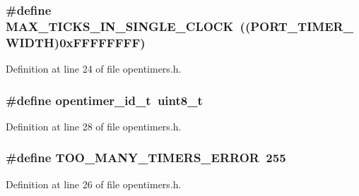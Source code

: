 \subsubsection[{\texorpdfstring{M\+A\+X\+\_\+\+T\+I\+C\+K\+S\+\_\+\+I\+N\+\_\+\+S\+I\+N\+G\+L\+E\+\_\+\+C\+L\+O\+CK}{MAX_TICKS_IN_SINGLE_CLOCK}}]{\setlength{\rightskip}{0pt plus 5cm}\#define M\+A\+X\+\_\+\+T\+I\+C\+K\+S\+\_\+\+I\+N\+\_\+\+S\+I\+N\+G\+L\+E\+\_\+\+C\+L\+O\+CK~(({\bf P\+O\+R\+T\+\_\+\+T\+I\+M\+E\+R\+\_\+\+W\+I\+D\+TH})0x\+F\+F\+F\+F\+F\+F\+F\+F)}\hypertarget{group___open_timers_ga9561941a53acd6abd5d0501eddefc2ad}{}\label{group___open_timers_ga9561941a53acd6abd5d0501eddefc2ad}


Definition at line 24 of file opentimers.\+h.

\subsubsection[{\texorpdfstring{opentimer\+\_\+id\+\_\+t}{opentimer_id_t}}]{\setlength{\rightskip}{0pt plus 5cm}\#define opentimer\+\_\+id\+\_\+t~{\bf uint8\+\_\+t}}\hypertarget{group___open_timers_gae5ca9e65d270cdfa4bc74008d96d69ab}{}\label{group___open_timers_gae5ca9e65d270cdfa4bc74008d96d69ab}


Definition at line 28 of file opentimers.\+h.

\subsubsection[{\texorpdfstring{T\+O\+O\+\_\+\+M\+A\+N\+Y\+\_\+\+T\+I\+M\+E\+R\+S\+\_\+\+E\+R\+R\+OR}{TOO_MANY_TIMERS_ERROR}}]{\setlength{\rightskip}{0pt plus 5cm}\#define T\+O\+O\+\_\+\+M\+A\+N\+Y\+\_\+\+T\+I\+M\+E\+R\+S\+\_\+\+E\+R\+R\+OR~255}\hypertarget{group___open_timers_ga8093989c737905bbf51a411475ef88e7}{}\label{group___open_timers_ga8093989c737905bbf51a411475ef88e7}


Definition at line 26 of file opentimers.\+h.



